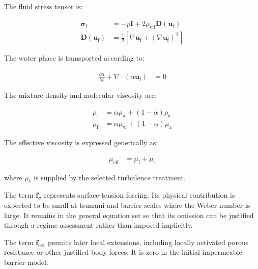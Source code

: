 The fluid stress tensor is:

\begin{align}
  \boldsymbol{\sigma}_{\mathrm{f}}
  &=
  -p\mathbf{I}
  +
  2\mu_{\mathrm{eff}}
  \mathbf{D}
  \left(
    \mathbf{u}_{\mathrm{f}}
  \right)
  \label{eq:res-mod-eqs-local-fluid-stress}
  \\
  \mathbf{D}
  \left(
    \mathbf{u}_{\mathrm{f}}
  \right)
  &=
  \frac{1}{2}
  \left[
    \nabla\mathbf{u}_{\mathrm{f}}
    +
    \left(
      \nabla\mathbf{u}_{\mathrm{f}}
    \right)^{\mathsf{T}}
  \right]
  \label{eq:res-mod-eqs-local-rate-of-deformation}
\end{align}

The water phase is transported according to:

\begin{align}
  \frac{\partial\alpha}{\partial t}
  +
  \nabla\cdot
  \left(
    \alpha\mathbf{u}_{\mathrm{f}}
  \right)
  &=
  0
  \label{eq:res-mod-eqs-local-phase-transport}
\end{align}

The mixture density and molecular viscosity are:

\begin{align}
  \rho_{\mathrm{f}}
  &=
  \alpha\rho_{\mathrm{w}}
  +
  \left(
    1-\alpha
  \right)\rho_{\mathrm{a}}
  \label{eq:res-mod-eqs-local-mixture-density}
  \\
  \mu_{\mathrm{f}}
  &=
  \alpha\mu_{\mathrm{w}}
  +
  \left(
    1-\alpha
  \right)\mu_{\mathrm{a}}
  \label{eq:res-mod-eqs-local-mixture-viscosity}
\end{align}

The effective viscosity is expressed generically as:

\begin{align}
  \mu_{\mathrm{eff}}
  &=
  \mu_{\mathrm{f}}
  +
  \mu_{\mathrm{t}}
  \label{eq:res-mod-eqs-local-effective-viscosity}
\end{align}

where $\mu_{\mathrm{t}}$ is supplied by the selected turbulence
treatment.

The term $\mathbf{f}_{\sigma}$ represents surface-tension forcing.
Its physical contribution is expected to be small at tsunami and
barrier scales where the Weber number is large. It remains in the
general equation set so that its omission can be justified through a
regime assessment rather than imposed implicitly.

The term $\mathbf{f}_{\mathrm{ext}}$ permits later local extensions,
including locally activated porous resistance or other justified body
forces. It is zero in the initial impermeable-barrier model.


